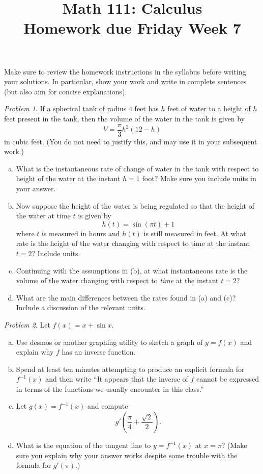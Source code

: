 \documentclass[11pt,twoside]{amsart}
\title{Math 111: Calculus\\ Homework due Friday Week 7}
\theoremstyle{plain}
\theoremstyle{remark}
\newtheorem{prob}{Problem}
\theoremstyle{definition}
\theoremstyle{definition}
\begin{document}
\maketitle

\noindent Make sure to review the homework instructions in the syllabus before writing your solutions. In particular, show your work and write in complete sentences (but also aim for concise explanations).

\begin{prob}
If a spherical tank of radius $4$ feet has $h$ feet of water to a height of $h$ feet present in the tank, then the volume of the water in the tank is given by
\[
  V = \frac{\pi}{3}h^2(12-h)
\]
in cubic feet. (You do not need to justify this, and may use it in your subsequent work.)
\begin{enumerate}[(a)]
\item What is the instantaneous rate of change of water in the tank with respect to height of the water at the instant $h=1$ foot? Make sure you include units in your answer.
\item Now suppose the height of the water is being regulated so that the height of the water at time $t$ is given by
\[
  h(t) = \sin(\pi t)+1
\]
where $t$ is measured in hours and $h(t)$ is still measured in feet. At what rate is the height of the water changing with respect to time at the instant $t=2$? Include units.
\item Continuing with the assumptions in (b), at what instantaneous rate is the volume of the water changing with respect to \emph{time} at the instant $t=2$?
\item What are the main differences between the rates found in (a) and (c)? Include a discussion of the relevant units.
\end{enumerate}
\end{prob}

\begin{prob}
Let $f(x)=x+\sin x$.
\begin{enumerate}[(a)]
\item Use desmos or another graphing utility to sketch a graph of $y=f(x)$ and explain why $f$ has an inverse function.
\item Spend at least ten minutes attempting to produce an explicit formula for $f^{-1}(x)$ and then write ``It appears that the inverse of $f$ cannot be expressed in terms of the functions we usually encounter in this class.''
\item Let $g(x)=f^{-1}(x)$ and compute
\[
  g'\left(\frac{\pi}{4}+\frac{\sqrt{2}}{2}\right).
\]
\item What is the equation of the tangent line to $y=f^{-1}(x)$ at $x=\pi$? (Make sure you explain why your answer works despite some trouble with the formula for $g'(\pi)$.)
\end{enumerate}
\end{prob}
\end{document}
